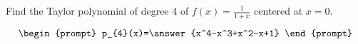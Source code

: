 \documentclass{ximera}
\author{Gregory Hartman \and Matthew Carr}
\begin{document}
\begin{exercise}




Find the Taylor polynomial of degree $4$ of $f(x)=\frac{1}{1+x}$ centered at $x=0$.

\[
\begin{prompt}
p_{4}(x)=\answer{x^4-x^3+x^2-x+1}
\end{prompt}
\]

\end{exercise}
\end{document}

